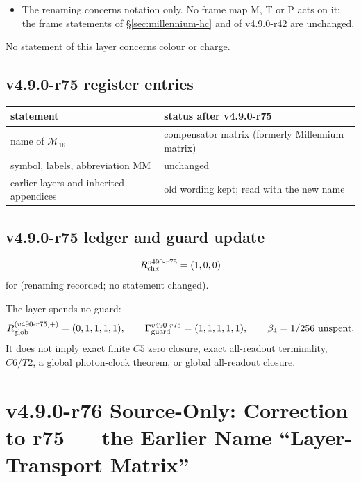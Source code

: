 \begin{itemize}[leftmargin=2em]
\item The renaming concerns notation only.  No frame map M, T or P acts on it; the frame statements of
\S\ref{sec:millennium-hc} and of v4.9.0-r42 are unchanged.
\end{itemize}
No statement of this layer concerns colour or charge.

\subsection*{v4.9.0-r75 register entries}
\label{subsec:v490-r75-register}

\begin{center}
\small
\begin{tabular}{@{}>{\raggedright\arraybackslash}p{}>{\raggedright\arraybackslash}p{}@{}}
\toprule
statement & status after v4.9.0-r75\\
\midrule
name of \(\mathcal M_{16}\) & compensator matrix (formerly Millennium matrix)\\
symbol, labels, abbreviation MM & unchanged\\
earlier layers and inherited appendices & old wording kept; read with the new name\\
\bottomrule
\end{tabular}
\end{center}

\subsection*{v4.9.0-r75 ledger and guard update}
\label{subsec:v490-r75-ledger-guard}

\[
R_{\rm chk}^{v490\text{-}r75}=(1,0,0)
\]
for (renaming recorded; no statement changed).

The layer spends no guard:
\[
R_{\rm glob}^{(v490\text{-}r75,+)}=(0,1,1,1,1),
\qquad
\Gamma_{\rm guard}^{v490\text{-}r75}=(1,1,1,1,1),
\qquad
\beta_4=1/256\ \text{unspent}.
\]
It does not imply exact finite \(C5\) zero closure, exact all-readout terminality,
\(C6/T2\), a global photon-clock theorem, or global all-readout closure.

\clearpage
\section*{v4.9.0-r76 Source-Only: Correction to r75 --- the Earlier Name ``Layer-Transport Matrix''}
\label{sec:v490-r76-name-correction}


